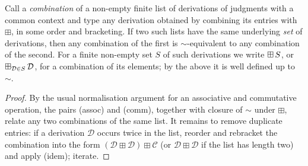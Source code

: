 \begin{lemma}
\label{lemma:sum_combinations}
Call a \emph{combination} of a non-empty finite list of derivations of judgments with a common context and type any derivation obtained by combining its entries with $\boxplus$, in some order and bracketing.
If two such lists have the same underlying \emph{set} of derivations, then any combination of the first is $\sim$-equivalent to any combination of the second.
For a finite non-empty set $S$ of such derivations we write $\mathop{\boxplus}\displaylimits S$, or $\mathop{\boxplus}\displaylimits_{\mathcal{D} \in S} \mathcal{D}$, for a combination of its elements; by the above it is well defined up to $\sim$.
\end{lemma}
\begin{proof}
By the usual normalisation argument for an associative and commutative operation, the pairs (assoc) and (comm), together with closure of $\sim$ under $\boxplus$, relate any two combinations of the same list.
It remains to remove duplicate entries: if a derivation $\mathcal{D}$ occurs twice in the list, reorder and rebracket the combination into the form $(\mathcal{D} \boxplus \mathcal{D}) \boxplus \mathcal{C}$ (or $\mathcal{D} \boxplus \mathcal{D}$ if the list has length two) and apply (idem); iterate.
\end{proof}

